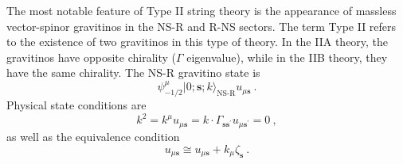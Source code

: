 	The most notable feature of Type II string theory is the appearance of massless vector-spinor gravitinos in the NS-R and R-NS sectors. The term Type II refers to the existence of two gravitinos in this type of theory. In the IIA theory, the gravitinos have opposite chirality ($\Gamma$ eigenvalue), while in the IIB theory, they have the same chirality. The NS-R gravitino state is
	\begin{equation}
		\psi_{-1/2}^{\mu}\lvert 0;\mathbf{s};k\rangle_{\text{NS-R}} u_{\mu\mathbf{s}} \:. \label{10.6.12}
	\end{equation}
	Physical state conditions are
	\begin{equation}
		k^{2}=k^{\mu}u_{\mu\mathbf{s}}=k\cdot \Gamma_{\mathbf{s}\mathbf{s}^{\prime}}u_{\mu\mathbf{s}^{\prime}}=0\:,\label{10.6.13}
	\end{equation}
	as well as the equivalence condition
	\begin{equation}
		u_{\mu\mathbf{s}} \cong u_{\mu\mathbf{s}} + k_{\mu}\zeta_{\mathbf{s}} \:. \label{10.6.14}
	\end{equation}
